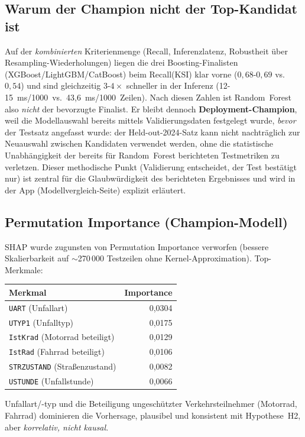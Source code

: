 \documentclass[11pt,a4paper]{article}
\newcommand{\code}[1]{\texttt{\small #1}}
\begin{document}
\subsection*{Warum der Champion nicht der Top-Kandidat ist}
Auf der \emph{kombinierten} Kriterienmenge (Recall, Inferenzlatenz,
Robustheit über Resampling-Wiederholungen) liegen die drei
Boosting-Finalisten (XGBoost/LightGBM/CatBoost) beim Recall(KSI)
klar vorne ($0{,}68$-$0{,}69$ vs.\ $0{,}54$) und sind gleichzeitig
$3$-$4\times$ schneller in der Inferenz (12-15~ms/1000~vs.\
43{,}6~ms/1000~Zeilen). Nach diesen Zahlen ist Random~Forest also
\emph{nicht} der bevorzugte Finalist. Er bleibt dennoch
\textbf{Deployment-Champion}, weil die Modellauswahl bereits mittels
Validierungsdaten festgelegt wurde, \emph{bevor} der Testsatz
angefasst wurde: der Held-out-2024-Satz kann nicht nachträglich zur
Neuauswahl zwischen Kandidaten verwendet werden, ohne die
statistische Unabhängigkeit der bereits für Random~Forest berichteten
Testmetriken zu verletzen. Dieser methodische Punkt (Validierung
entscheidet, der Test bestätigt nur) ist zentral für die
Glaubwürdigkeit des berichteten Ergebnisses und wird in der App
(Modellvergleich-Seite) explizit erläutert.

\subsection*{Permutation Importance (Champion-Modell)}
SHAP wurde zugunsten von Permutation Importance verworfen (bessere
Skalierbarkeit auf $\sim$270\,000 Testzeilen ohne Kernel-Approximation).
Top-Merkmale:

\begin{center}
\small
\begin{tabularx}{\linewidth}{Yr}
\toprule
\textbf{Merkmal} & \textbf{Importance} \\
\midrule
\code{UART} (Unfallart) & 0{,}0304 \\
\code{UTYP1} (Unfalltyp) & 0{,}0175 \\
\code{IstKrad} (Motorrad beteiligt) & 0{,}0129 \\
\code{IstRad} (Fahrrad beteiligt) & 0{,}0106 \\
\code{STRZUSTAND} (Straßenzustand) & 0{,}0082 \\
\code{USTUNDE} (Unfallstunde) & 0{,}0066 \\
\bottomrule
\end{tabularx}
\end{center}
Unfallart/-typ und die Beteiligung ungeschützter Verkehrsteilnehmer
(Motorrad, Fahrrad) dominieren die Vorhersage, plausibel und
konsistent mit Hypothese~H2, aber \emph{korrelativ, nicht kausal}.
\end{document}

